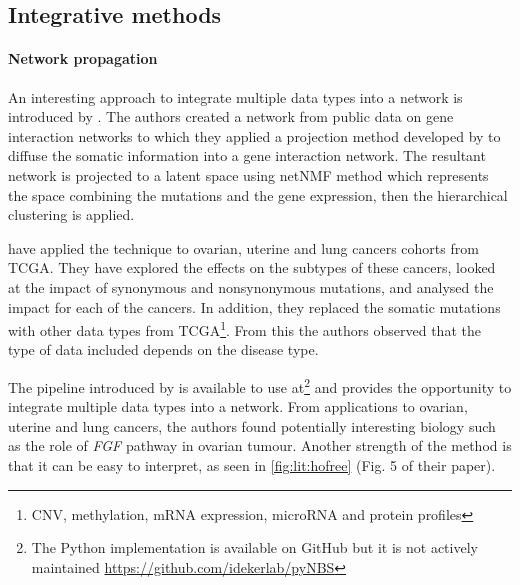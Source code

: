 \subsection{Integrative methods} \label{s:lit:net_data_int}

\vspace{3mm}
\vspace{3mm}


\paragraph*{Network propagation} \label{s:lit:net_prop}

An interesting approach to integrate multiple data types into a network is introduced by  \citet{Hofree2013-ld}. The authors created a network from public data on gene interaction networks \citep{Szklarczyk2019-pu, Cerami2011-ql, Lee2011-xj} to which they applied a projection method developed by \citet{Vanunu2010-el} to diffuse the somatic information into a gene interaction network. The resultant network is projected to a latent space using netNMF method \citep{Cai2008-fv} which represents the space combining the mutations and the gene expression, then the hierarchical clustering is applied.

\citet{Hofree2013-ld} have applied the technique to ovarian, uterine and lung cancers cohorts from TCGA. They have explored the effects on the subtypes of these cancers, looked at the impact of synonymous and nonsynonymous mutations, and analysed the impact for each of the cancers. In addition, they replaced the somatic mutations with other data types from TCGA\footnote{CNV, methylation, mRNA expression, microRNA and protein profiles}. From this the authors observed that the type of data included depends on the disease type.

The pipeline introduced by \citet{Hofree2013-ld} is available to use at\footnote{The Python implementation is available on GitHub but it is not actively maintained \url{https://github.com/idekerlab/pyNBS}} and provides the opportunity to integrate multiple data types into a network. From applications to ovarian, uterine and lung cancers, the authors found potentially interesting biology such as the role of \textit{FGF} pathway in ovarian tumour. Another strength of the method is that it can be easy to interpret, as seen in \cref{fig:lit:hofree} (Fig. 5 of their paper).

